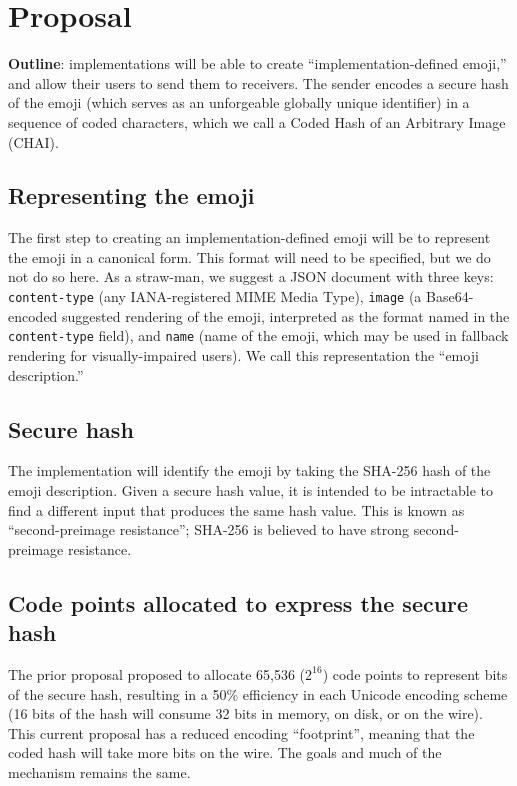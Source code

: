 \documentclass[12pt]{article}
\begin{document}
\section{Proposal}

\textbf{Outline}: implementations will be able to create
``implementation-defined emoji,'' and allow their users to send them
to receivers. The sender encodes a secure hash of the emoji (which
serves as an unforgeable globally unique identifier) in a sequence of
coded characters, which we call a Coded Hash of an Arbitrary Image
(CHAI).


\subsection{Representing the emoji}

The first step to creating an implementation-defined emoji will be to
represent the emoji in a canonical form. This format will need to be
specified, but we do not do so here. As a straw-man, we suggest a JSON
document with three keys: \texttt{content-type} (any IANA-registered MIME
Media Type), \texttt{image} (a Base64-encoded suggested rendering of the emoji,
interpreted as the format named in the \texttt{content-type} field), and
\texttt{name} (name of the emoji, which may be used in fallback
rendering for visually-impaired users). We call this representation
the ``emoji description.''

\subsection{Secure hash}

The implementation will identify the emoji by taking the SHA-256 hash
of the emoji description. Given a secure hash value, it is intended to be
intractable to find a different input that produces the same
hash value. This is known as ``second-preimage resistance'';
SHA-256 is believed to have strong second-preimage resistance.

\subsection{Code points allocated to express the secure hash}

The prior proposal proposed to allocate 65,536 ($2^{16}$) code points to represent bits
of the secure hash, resulting in a 50\% efficiency in each Unicode encoding scheme (16 bits of
the hash will consume 32 bits in memory, on disk, or on the wire)\autocite{L216105}. This current proposal has a reduced encoding ``footprint'', meaning that the coded hash will take more bits
on the wire. The goals and much of the mechanism remains the same.
\end{document}
